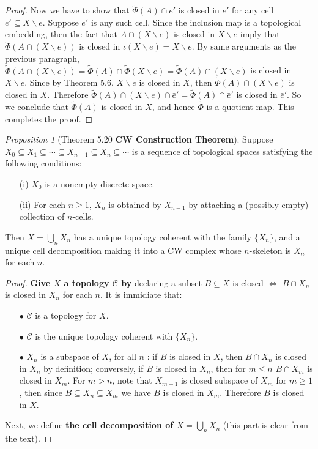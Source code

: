 \documentclass[a4paper]{article}
\theoremstyle{remark}
\newtheorem{prop}{Proposition}
\newcommand{\subhim}{\subseteq} %
\begin{document}
\begin{proof}
	Now we have to show that $\tilde{\Phi}(A) \cap \bar{e}'$ is closed in $\bar{e}'$ for any cell $e' \subhim X \smallsetminus e$. Suppose $e'$ is any such cell. Since the inclusion map is a topological embedding, then the fact that $A \cap (X \smallsetminus e)$ is closed in $X \smallsetminus e$ imply that $\tilde{\Phi}(A \cap (X \smallsetminus e))$ is closed in $\iota(X \smallsetminus e) = X \smallsetminus e$. By same arguments as the previous paragraph, $\tilde{\Phi}(A \cap (X \smallsetminus e)) = \tilde{\Phi}(A) \cap \tilde{\Phi} (X \smallsetminus e) = \tilde{\Phi}(A) \cap  (X \smallsetminus e) $ is closed in $X \smallsetminus e$. Since by Theorem 5.6, $X \smallsetminus e$ is closed in $X$, then $\tilde{\Phi}(A) \cap  (X \smallsetminus e)$ is closed in $X$. Therefore $\tilde{\Phi}(A) \cap  (X \smallsetminus e) \cap \bar{e}' = \tilde{\Phi}(A) \cap  \bar{e}'$ is closed in $\bar{e}'$. So we conclude that $\tilde{\Phi}(A)$ is closed in $X$, and hence $\tilde{\Phi}$ is a quotient map. This completes the proof.
\end{proof}

\begin{prop}[Theorem 5.20 \textbf{CW Construction Theorem}]
Suppose $X_0 \subhim X_1 \subhim \cdots \subhim X_{n-1} \subhim X_n \subhim \cdots$ is a sequence of topological spaces satisfying the following conditions:
\begin{enumerate}[nolistsep]
	\item [(i)] $X_0$ is a nonempty discrete space.
	\item [(ii)] For each $n \geq 1$, $X_n$ is obtained by $X_{n-1}$ by attaching a (possibly empty) collection of $n$-cells. 
\end{enumerate}
Then $X = \bigcup_n X_n$ has a unique topology coherent with the family $\{X_n\}$, and a unique cell decomposition making it into a CW complex whose $n$-skeleton is $X_n$ for each $n$. 	
\end{prop}
\begin{proof}
	\textbf{Give $X$ a topology $\mathcal{C}$ by }declaring a subset $B \subhim X$ is closed $\Leftrightarrow$ $B \cap X_n$ is closed in $X_n$ for each $n$. It is immidiate that:
	\begin{enumerate}[nolistsep]
		\item [$\bullet$] $\mathcal{C}$ is a topology for $X$.
		\item [$\bullet$] $\mathcal{C}$ is the unique topology coherent with $\{X_n\}$.
		\item [$\bullet$] $X_n$ is a subspace of $X$, for all $n$ : if $B$ is closed in $X$, then $B \cap X_n$ is closed in $X_n$ by definition; conversely, if $B$ is closed in $X_n$, then for $m\leq n$ $B \cap X_m$ is closed in $X_m$. For $m> n$, note that $X_{m-1}$ is closed subspace of $X_m$ for $m \geq 1$, then since $B \subhim X_n \subhim X_m$ we have $B$ is closed in $X_m$. Therefore $B$ is closed in $X$.
	\end{enumerate} 
Next, we define \textbf{the cell decomposition of $X=\bigcup_{n} X_n$} (this part is clear from the text).


\end{proof}
\end{document}
